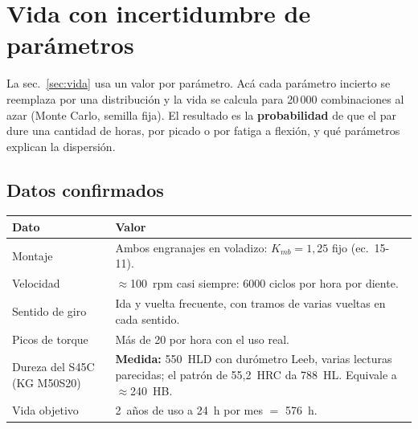 \documentclass[11pt,a4paper]{article}
\begin{document}
\section{Vida con incertidumbre de parámetros}\label{sec:mc}
La sec.~\ref{sec:vida} usa un valor por parámetro. Acá cada parámetro incierto se reemplaza por una distribución y la vida
se calcula para 20\,000 combinaciones al azar (Monte Carlo, semilla fija). El resultado es la \textbf{probabilidad} de que
el par dure una cantidad de horas, por picado o por fatiga a flexión, y qué parámetros explican la dispersión.

\subsection{Datos confirmados}
\begin{table}[H]\centering\small
\begin{tabularx}{\linewidth}{l X}
\toprule
Dato & Valor\\\midrule
Montaje & Ambos engranajes en voladizo: $K_{mb}=1{,}25$ fijo (ec.~15-11).\\
Velocidad & $\approx$100~rpm casi siempre: 6000 ciclos por hora por diente.\\
Sentido de giro & Ida y vuelta frecuente, con tramos de varias vueltas en cada sentido.\\
Picos de torque & Más de 20 por hora con el uso real.\\
Dureza del S45C (KG M50S20) & \textbf{Medida:} 550~HLD con durómetro Leeb, varias lecturas parecidas; el patrón de
                               55,2~HRC da 788~HL. Equivale a $\approx$240~HB.\\
Vida objetivo & 2~años de uso a 24~h por mes $=$ 576~h.\\
\bottomrule
\end{tabularx}
\end{table}
\end{document}
